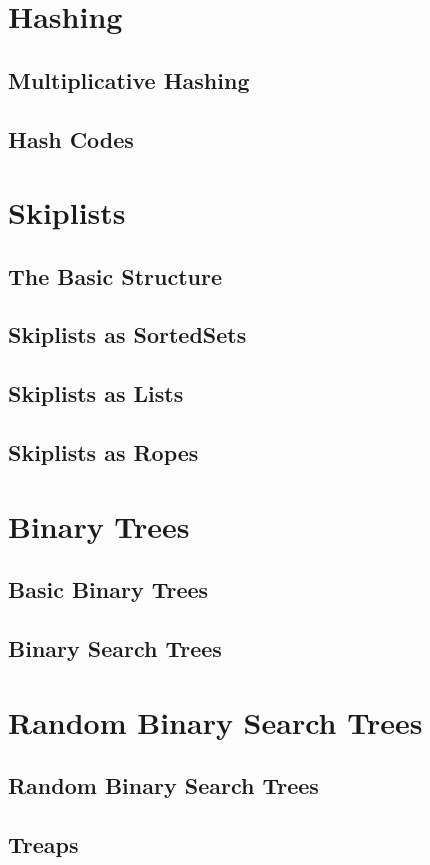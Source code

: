 \documentclass{book}
\begin{document}
\chapter{Hashing}
\section{Multiplicative Hashing}
\section{Hash Codes}

\chapter{Skiplists}
\section{The Basic Structure}
\section{Skiplists as SortedSets}
\section{Skiplists as Lists}
\section{Skiplists as Ropes}

\chapter{Binary Trees}
\section{Basic Binary Trees}
\section{Binary Search Trees}

\chapter{Random Binary Search Trees}
\section{Random Binary Search Trees}
\section{Treaps}
\end{document}

